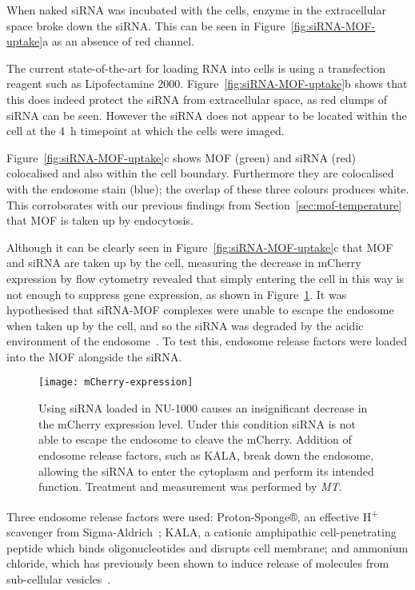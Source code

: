 When naked siRNA was incubated with the cells, enzyme in the extracellular space broke down the siRNA.
This can be seen in Figure~\ref{fig:siRNA-MOF-uptake}a as an absence of red channel.

The current state-of-the-art for loading RNA into cells is using a transfection reagent such as Lipofectamine 2000.
Figure~\ref{fig:siRNA-MOF-uptake}b shows that this does indeed protect the siRNA from extracellular space, as red clumps of siRNA can be seen.
However the siRNA does not appear to be located within the cell at the \SI{4}{\hour} timepoint at which the cells were imaged.

Figure~\ref{fig:siRNA-MOF-uptake}c shows MOF (green) and siRNA (red) colocalised and also within the cell boundary.
Furthermore they are colocalised with the endosome stain (blue); the overlap of these three colours produces white.
This corroborates with our previous findings from Section~\ref{sec:mof-temperature} that MOF is taken up by endocytosis.

Although it can be clearly seen in Figure~\ref{fig:siRNA-MOF-uptake}c that MOF and siRNA are taken up by the cell, measuring the decrease in mCherry expression by flow cytometry revealed that simply entering the cell in this way is not enough to suppress gene expression, as shown in Figure~\ref{fig:mCherry-expression}.
It was hypothesised that siRNA-MOF complexes were unable to escape the endosome when taken up by the cell, and so the siRNA was degraded by the acidic environment of the endosome~\cite{geisow1984ph}.
To test this, endosome release factors were loaded into the MOF alongside the siRNA.

\begin{figure}[htbp!]
\centering
\texttt{[image: mCherry-expression]}
\caption[MOFs: siRNA suppresses mCherry expression when an endosome release factor is loaded to MOFs]{ Using siRNA loaded in NU-1000 causes an insignificant decrease in the mCherry expression level. Under this condition siRNA is not able to escape the endosome to cleave the mCherry. Addition of endosome release factors, such as KALA, break down the endosome, allowing the siRNA to enter the cytoplasm and perform its intended function. Treatment and measurement was performed by \textit{MT}. }
\label{fig:mCherry-expression}
\end{figure}

Three endosome release factors were used: Proton-Sponge®, an effective H\textsuperscript{+} scavenger from Sigma-Aldrich~\cite{ozkar2002nanocluster}; KALA, a cationic amphipathic cell-penetrating peptide which binds oligonucleotides and disrupts cell membrane; and ammonium chloride, which has previously been shown to induce release of molecules from sub-cellular vesicles~\cite{cervia2017distinct}.


